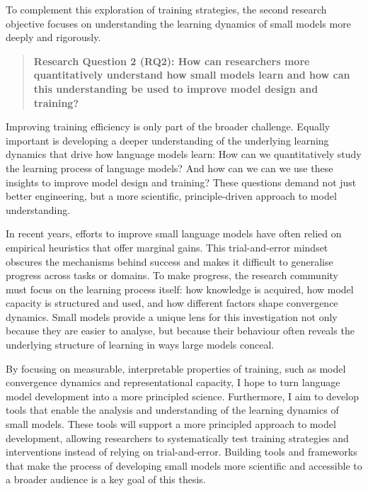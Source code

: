 To complement this exploration of training strategies, the second research objective focuses on understanding the learning dynamics of small models more deeply and rigorously.

\begin{quote}
    \textbf{Research Question 2 (RQ2): How can researchers more quantitatively understand how small models learn and how can this understanding be used to improve model design and training?}
\end{quote}

Improving training efficiency is only part of the broader challenge. Equally important is developing a deeper understanding of the underlying learning dynamics that drive how language models learn: How can we quantitatively study the learning process of language models? And how can we can we use these insights to improve model design and training? These questions demand not just better engineering, but a more scientific, principle-driven approach to model understanding.

In recent years, efforts to improve small language models have often relied on empirical heuristics that offer marginal gains. This trial-and-error mindset obscures the mechanisms behind success and makes it difficult to generalise progress across tasks or domains. To make progress, the research community must focus on the learning process itself: how knowledge is acquired, how model capacity is structured and used, and how different factors shape convergence dynamics. Small models provide a unique lens for this investigation not only because they are easier to analyse, but because their behaviour often reveals the underlying structure of learning in ways large models conceal.

By focusing on measurable, interpretable properties of training, such as model convergence dynamics and representational capacity, I hope to turn language model development into a more principled science. Furthermore, I aim to develop tools that enable the analysis and understanding of the learning dynamics of small models. These tools will support a more principled approach to model development, allowing researchers to systematically test training strategies and interventions instead of relying on trial-and-error. Building tools and frameworks that make the process of developing small models more scientific and accessible to a broader audience is a key goal of this thesis.
